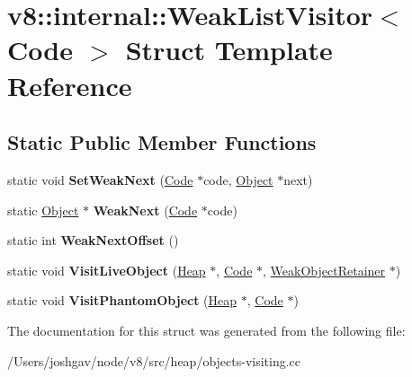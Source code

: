 \hypertarget{structv8_1_1internal_1_1_weak_list_visitor_3_01_code_01_4}{}\section{v8\+:\+:internal\+:\+:Weak\+List\+Visitor$<$ Code $>$ Struct Template Reference}
\label{structv8_1_1internal_1_1_weak_list_visitor_3_01_code_01_4}
\subsection*{Static Public Member Functions}
\begin{DoxyCompactItemize}
\item 
static void {\bfseries Set\+Weak\+Next} (\hyperlink{classv8_1_1internal_1_1_code}{Code} $\ast$code, \hyperlink{classv8_1_1internal_1_1_object}{Object} $\ast$next)\hypertarget{structv8_1_1internal_1_1_weak_list_visitor_3_01_code_01_4_a994d55e4391e787729a198a9c9d8100f}{}\label{structv8_1_1internal_1_1_weak_list_visitor_3_01_code_01_4_a994d55e4391e787729a198a9c9d8100f}

\item 
static \hyperlink{classv8_1_1internal_1_1_object}{Object} $\ast$ {\bfseries Weak\+Next} (\hyperlink{classv8_1_1internal_1_1_code}{Code} $\ast$code)\hypertarget{structv8_1_1internal_1_1_weak_list_visitor_3_01_code_01_4_a796be782480704bfddb0f20cc00c9177}{}\label{structv8_1_1internal_1_1_weak_list_visitor_3_01_code_01_4_a796be782480704bfddb0f20cc00c9177}

\item 
static int {\bfseries Weak\+Next\+Offset} ()\hypertarget{structv8_1_1internal_1_1_weak_list_visitor_3_01_code_01_4_a9da8020888576e0922bd38c4daabbddc}{}\label{structv8_1_1internal_1_1_weak_list_visitor_3_01_code_01_4_a9da8020888576e0922bd38c4daabbddc}

\item 
static void {\bfseries Visit\+Live\+Object} (\hyperlink{classv8_1_1internal_1_1_heap}{Heap} $\ast$, \hyperlink{classv8_1_1internal_1_1_code}{Code} $\ast$, \hyperlink{classv8_1_1internal_1_1_weak_object_retainer}{Weak\+Object\+Retainer} $\ast$)\hypertarget{structv8_1_1internal_1_1_weak_list_visitor_3_01_code_01_4_a1b5ca5e74b470e0fa5e8c2ea11e73ae2}{}\label{structv8_1_1internal_1_1_weak_list_visitor_3_01_code_01_4_a1b5ca5e74b470e0fa5e8c2ea11e73ae2}

\item 
static void {\bfseries Visit\+Phantom\+Object} (\hyperlink{classv8_1_1internal_1_1_heap}{Heap} $\ast$, \hyperlink{classv8_1_1internal_1_1_code}{Code} $\ast$)\hypertarget{structv8_1_1internal_1_1_weak_list_visitor_3_01_code_01_4_a7b7ee9ecac6889db7c2fc37557cd4b66}{}\label{structv8_1_1internal_1_1_weak_list_visitor_3_01_code_01_4_a7b7ee9ecac6889db7c2fc37557cd4b66}

\end{DoxyCompactItemize}


The documentation for this struct was generated from the following file\+:\begin{DoxyCompactItemize}
\item 
/\+Users/joshgav/node/v8/src/heap/objects-\/visiting.\+cc\end{DoxyCompactItemize}
